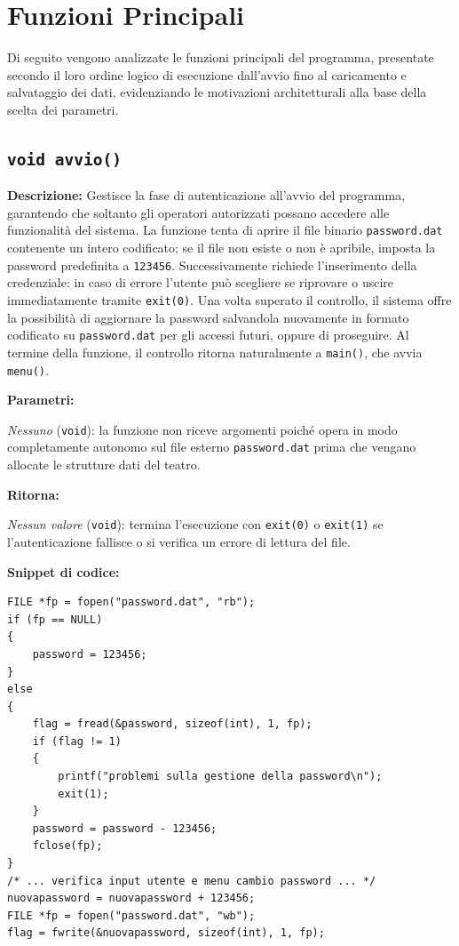 \documentclass[11pt,a4paper,oneside,openany]{book}
\newenvironment{listacomp}{%
    \small
    \begin{list}{\textendash}{%
        \setlength{\topsep}{2pt}%
        \setlength{\partopsep}{0pt}%
        \setlength{\itemsep}{1pt}%
        \setlength{\parsep}{0pt}%
        \setlength{\leftmargin}{1.2em}%
    }%
}{%
    \end{list}%
}
\begin{document}
\section{Funzioni Principali}

Di seguito vengono analizzate le funzioni principali del programma, presentate secondo il loro ordine logico di esecuzione dall'avvio fino al caricamento e salvataggio dei dati, evidenziando le motivazioni architetturali alla base della scelta dei parametri.

\subsection[avvio()]{\texttt{void avvio()}}

\noindent\textbf{Descrizione:}
Gestisce la fase di autenticazione all'avvio del programma, garantendo che soltanto gli operatori autorizzati possano accedere alle funzionalità del sistema. La funzione tenta di aprire il file binario \texttt{password.dat} contenente un intero codificato; se il file non esiste o non è apribile, imposta la password predefinita a \texttt{123456}. Successivamente richiede l'inserimento della credenziale: in caso di errore l'utente può scegliere se riprovare o uscire immediatamente tramite \texttt{exit(0)}. Una volta superato il controllo, il sistema offre la possibilità di aggiornare la password salvandola nuovamente in formato codificato su \texttt{password.dat} per gli accessi futuri, oppure di proseguire. Al termine della funzione, il controllo ritorna naturalmente a \texttt{main()}, che avvia \texttt{menu()}.

\noindent\textbf{Parametri:}
\begin{listacomp}
    \item \textit{Nessuno} (\texttt{void}): la funzione non riceve argomenti poiché opera in modo completamente autonomo sul file esterno \texttt{password.dat} prima che vengano allocate le strutture dati del teatro.
\end{listacomp}

\noindent\textbf{Ritorna:}
\begin{listacomp}
    \item \textit{Nessun valore} (\texttt{void}): termina l'esecuzione con \texttt{exit(0)} o \texttt{exit(1)} se l'autenticazione fallisce o si verifica un errore di lettura del file.
\end{listacomp}

\noindent\textbf{Snippet di codice:}
\begin{lstlisting}[caption={Autenticazione iniziale e codifica password in avvio()}]
FILE *fp = fopen("password.dat", "rb");
if (fp == NULL)
{
    password = 123456;
}
else
{
    flag = fread(&password, sizeof(int), 1, fp);
    if (flag != 1)
    {
        printf("problemi sulla gestione della password\n");
        exit(1);
    }
    password = password - 123456;
    fclose(fp);
}
/* ... verifica input utente e menu cambio password ... */
nuovapassword = nuovapassword + 123456;
FILE *fp = fopen("password.dat", "wb");
flag = fwrite(&nuovapassword, sizeof(int), 1, fp);
\end{lstlisting}
\end{document}
